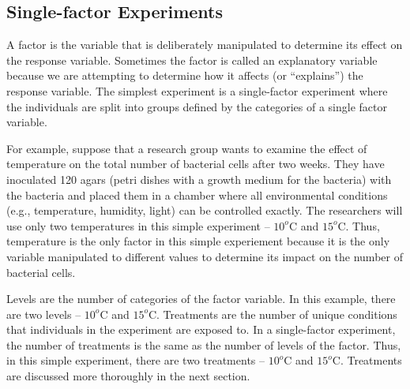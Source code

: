 \documentclass[10pt,openany]{book}\usepackage[]{graphicx}\usepackage[]{color}
\begin{document}

\vspace{-12pt}

\subsection{Single-factor Experiments}
A factor is the variable that is deliberately manipulated to determine its effect on the response variable.  Sometimes the factor is called an explanatory variable because we are attempting to determine how it affects (or ``explains'') the response variable.  The simplest experiment is a single-factor experiment where the individuals are split into groups defined by the categories of a single factor variable.

For example, suppose that a research group wants to examine the effect of temperature on the total number of bacterial cells after two weeks. They have inoculated 120 agars (petri dishes with a growth medium for the bacteria) with the bacteria and placed them in a chamber where all environmental conditions (e.g., temperature, humidity, light) can be controlled exactly.  The researchers will use only two temperatures in this simple experiment -- $10^{o}$C and $15^{o}$C.  Thus, temperature is the only factor in this simple experiement because it is the only variable manipulated to different values to determine its impact on the number of bacterial cells.


\vspace{-12pt}

\vspace{-12pt}

Levels are the number of categories of the factor variable.  In this example, there are two levels -- $10^{o}$C and $15^{o}$C.  Treatments are the number of unique conditions that individuals in the experiment are exposed to.  In a single-factor experiment, the number of treatments is the same as the number of levels of the factor.  Thus, in this simple experiment, there are two treatments -- $10^{o}$C and $15^{o}$C.  Treatments are discussed more thoroughly in the next section.
\end{document}
